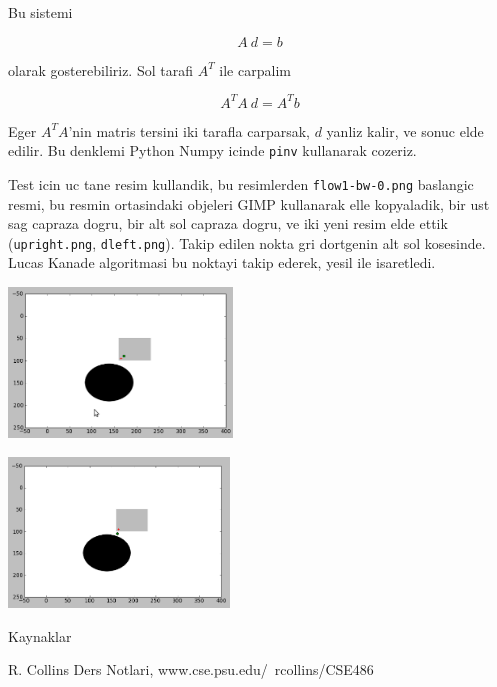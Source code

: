 \documentclass[12pt,fleqn]{article}
\begin{document}
Bu sistemi

\[ A \ d = b \]

olarak gosterebiliriz. Sol tarafi $A^T$ ile carpalim

\[ A^TA \ d = A^Tb \]

Eger $A^TA$'nin matris tersini iki tarafla carparsak, $d$ yanliz kalir, ve
sonuc elde edilir. Bu denklemi Python Numpy icinde \verb!pinv! kullanarak
cozeriz. 

Test icin uc tane resim kullandik, bu resimlerden \verb!flow1-bw-0.png!
baslangic resmi, bu resmin ortasindaki objeleri GIMP kullanarak elle
kopyaladik, bir ust sag capraza dogru, bir alt sol capraza dogru, ve iki
yeni resim elde ettik (\verb!upright.png!, \verb!dleft.png!). Takip edilen
nokta gri dortgenin alt sol kosesinde. Lucas Kanade algoritmasi bu noktayi
takip ederek, yesil ile isaretledi.

\includegraphics[height=4cm]{res1.png}

\includegraphics[height=4cm]{res2.png}





Kaynaklar

R. Collins Ders Notlari, www.cse.psu.edu/~rcollins/CSE486
\end{document}
